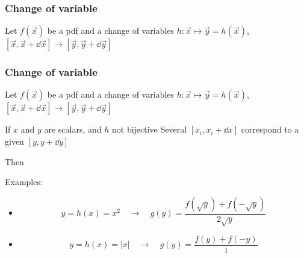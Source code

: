\documentclass[9pt]{beamer}
\newif\ifmynote
\newcommand\mynote[1]{%
\ifmynote \textbf{#1} \else \fi
}
\begin{document}
\begin{frame}
 \frametitle{Change of variable}
 
 \mynote{Écrire au tableau}
 
 Let $f(\vec{x})$ be a pdf and a change of variables $h: \vec{x} \mapsto \vec{y} = h(\vec{x})$, $[\vec{x}, \vec{x} + \dd\vec{x}] \to [\vec{y}, \vec{y} + \dd\vec{y}]$
 
 \vspace{10pt}
 
 

\end{frame}

\begin{frame}
 \frametitle{Change of variable}
 
 \mynote{Écrire au tableau}
 
 Let $f(\vec{x})$ be a pdf and a change of variables $h: \vec{x} \mapsto \vec{y} = h(\vec{x})$, $[\vec{x}, \vec{x} + \dd\vec{x}] \to [\vec{y}, \vec{y} + \dd\vec{y}]$
 
 \vspace{10pt}
 
 
 
 \begin{block}{If $x$ and $y$ are scalars, and $h$ not bijective}
  Several $[x_i,x_i+\dd x]$ correspond to a given $[y,y+\dd y]$
  
  Then 
 \end{block}
 
 Examples:
 
 \begin{itemize}
  \item $$y = h(x) = x^2\quad \longrightarrow \quad g(y) = \frac{f(\sqrt{y}) + f(-\sqrt{y})}{2\sqrt{y}}$$
  \item $$y = h(x) = |x|\quad \longrightarrow \quad g(y) = \frac{f(y) + f(-y)}{1}$$
 \end{itemize}


\end{frame}
\end{document}

